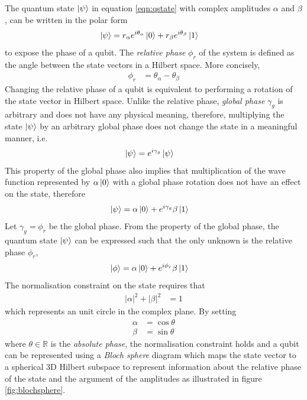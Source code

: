 The quantum state ${\ket{\psi}}$ in equation \ref{eqn:qstate} with complex amplitudes $\alpha$ and $\beta$, can be written in the polar form 
\begin{align}\label{eqn:qstatephase}
	\ket{\psi}	& = r_{\alpha}e^{i\theta_\alpha}\ket{0} + r_{\beta}e^{i\theta_\beta}\ket{1}
\end{align}
to expose the phase of a qubit. The \textit{relative phase} $\phi_r$ of the system is defined as the angle between the state vectors in a Hilbert space. More concisely,
\begin{align}
	\phi_r	& = \theta_\alpha - \theta_\beta
\end{align}
Changing the relative phase of a qubit is equivalent to performing a rotation of the state vector in Hilbert space. Unlike the relative phase, \textit{global phase} $\gamma_g$ is arbitrary and does not have any physical meaning, therefore, multiplying the state $\ket{\psi}$ by an arbitrary global phase does not change the state in a meaningful manner, i.e.
\begin{align}
	\ket{\psi}	& = e^{i\gamma_g}\ket{\psi}
\end{align}
This property of the global phase also implies that multiplication of the wave function represented by $\alpha\ket{0}$ with a global phase rotation does not have an effect on the state, therefore
\begin{align}
	\ket{\psi} & = \alpha \ket{0} + e^{i\gamma_g}{\beta}\ket{1}\nonumber
\end{align}
Let $\gamma_g = \phi_r$ be the global phase. From the property of the global phase, the quantum state $\ket{\psi}$ can be expressed such that the only unknown is the relative phase $\phi_r$,
\begin{align}
	\ket{\phi}	& = \alpha\ket{0} + e^{i\phi_r}\beta\ket{1}
\end{align}
The normalisation constraint on the state requires that
\begin{align}
	|\alpha|^2+|\beta|^2&=1
\end{align}	
which represents an unit circle in the complex plane. By setting 
\begin{align}
	\alpha	& = \cos\theta\\
	\beta	& = \sin\theta
\end{align}
where $\theta \in \mathbb{R}$ is the \textit{absolute phase}, the normalisation constraint holds and a qubit can be represented using a \textit{Bloch sphere} diagram which maps the state vector to a spherical 3D Hilbert subspace to represent information about the relative phase of the state and the argument of the amplitudes as illustrated in figure \ref{fig:blochsphere}. 
